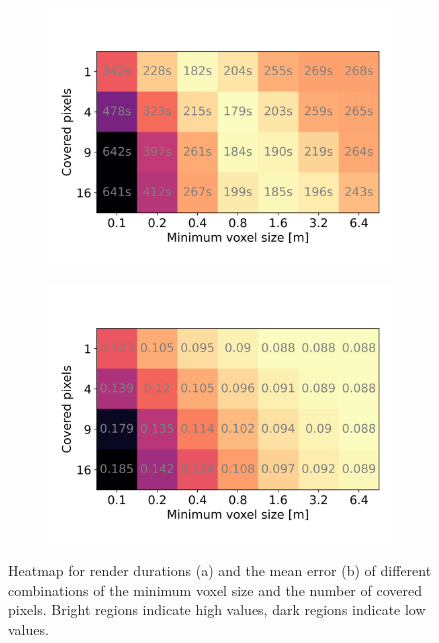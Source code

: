 \begin{figure}[ht]
    \centering
    \begin{subfigure}[b]{0.45\linewidth}
        \centering
        \includegraphics[width=1\linewidth]{img/results/render_durations.png}
        \caption{}
    \end{subfigure}
    \begin{subfigure}[b]{0.45\linewidth}
        \centering
        \includegraphics[width=1\linewidth]{img/results/flip_errors.png}
        \caption{}
    \end{subfigure}
	\caption[Heatmap of the \ac{lod} render durations and \FLIP errors.]{Heatmap for render durations (a) and the mean \FLIP error (b) of different combinations of the minimum voxel size and the number of covered pixels. Bright regions indicate high values, dark regions indicate low values.}
	\label{fig:lod_grid}
\end{figure}
